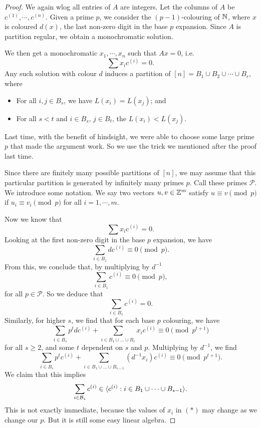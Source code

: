 \documentclass[a4paper]{article}
\begin{document}
  \begin{proof}
    We again wlog all entries of $A$ are integers. Let the columns of $A$ be $c^{(1)}, \cdots, c^{(n)}$. Given a prime $p$, we consider the $(p - 1)$-colouring of $\mathbb{N}$, where $x$ is coloured $d(x)$, the last non-zero digit in the base $p$ expansion. Since $A$ is partition regular, we obtain a monochromatic solution.

    We then get a monochromatic $x_1, \cdots, x_n$ such that $Ax = 0$, i.e.
    \[
      \sum x_i c^{(i)} = 0.
    \]
    Any such solution with colour $d$ induces a partition of $[n] = B_1 \cup B_2 \cup \cdots \cup B_r$, where
    \begin{itemize}
    \item For all $i, j \in B_s$, we have $L(x_i) = L(x_j)$; and
    \item For all $s < t$ and $i \in B_s$, $j \in B_t$, the $L(x_i) < L(x_j)$.
    \end{itemize}
    Last time, with the benefit of hindsight, we were able to choose some large prime $p$ that made the argument work. So we use the trick we mentioned after the proof last time.

    Since there are finitely many possible partitions of $[n]$, we may assume that this particular partition is generated by infinitely many primes $p$. Call these primes $\mathcal{P}$. We introduce some notation. We say two vectors $u, v \in \mathbb{Z}^m$ satisfy $u \equiv v \pmod p$ if $u_i \equiv v_i \pmod p$ for all $i = 1, \cdots, m$.

    Now we know that
    \[
      \sum x_i c^{(i)} = 0.
    \]
    Looking at the first non-zero digit in the base $p$ expansion, we have
    \[
      \sum_{i \in B_1} d c^{(i)} \equiv 0 \pmod p.
    \]
    From this, we conclude that, by multiplying by $d^{-1}$
    \[
      \sum_{i \in B_1} c^{(i)} \equiv 0 \pmod p,
    \]
    for all $p \in \mathcal{P}$. So we deduce that
    \[
      \sum_{i \in B_1} c^{(i)} = 0.
    \]
    Similarly, for higher $s$, we find that for each base $p$ colouring, we have
    \[
      \sum_{i \in B_s} p^t d c^{(i)} + \sum_{i \in B_1 \cup \ldots \cup B_s} x_i c^{(i)} \equiv 0 \pmod {p^{t + 1}}
    \]
    for all $s \geq 2$, and some $t$ dependent on $s$ and $p$. Multiplying by $d^{-1}$, we find
    \[
      \sum_{i \in B_s} p^t c^{(i)} + \sum_{i \in B_1 \cup \ldots \cup B_{s - 1}} (d^{-1} x_i) c^{(i)} \equiv 0 \pmod {p^{t + 1}}.\tag{$*$}
    \]
    We claim that this implies
    \[
      \sum_{i \in \mathcal{B}_s} c^{(i)} \in \langle c^{(i)}: i \in B_1 \cup \cdots
      \cup B_{s - 1}\rangle.
    \]
    This is not exactly immediate, because the values of $x_i$ in $(*)$ may change as we change our $p$. But it is still some easy linear algebra.


\end{proof}
\end{document}

